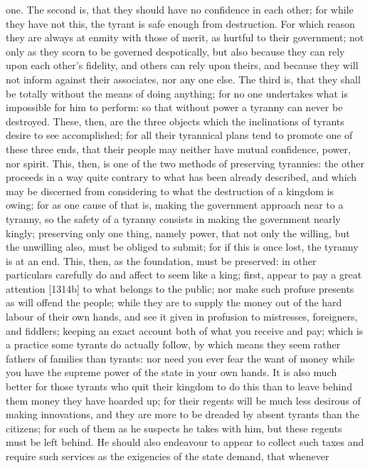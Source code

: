 one. The second is, that they should have no confidence in each other; for
while they have not this, the tyrant is safe enough from destruction. For
which reason they are always at enmity with those of merit, as hurtful to
their government; not only as they scorn to be governed despotically, but
also because they can rely upon each other's fidelity, and others can rely
upon theirs, and because they will not inform against their associates,
nor any one else. The third is, that they shall be totally without the
means of doing anything; for no one undertakes what is impossible for him
to perform: so that without power a tyranny can never be destroyed. These,
then, are the three objects which the inclinations of tyrants desire to
see accomplished; for all their tyrannical plans tend to promote one of
these three ends, that their people may neither have mutual confidence,
power, nor spirit. This, then, is one of the two methods of preserving
tyrannies: the other proceeds in a way quite contrary to what has been
already described, and which may be discerned from considering to what the
destruction of a kingdom is owing; for as one cause of that is, making the
government approach near to a tyranny, so the safety of a tyranny consists
in making the government nearly kingly; preserving only one thing, namely
power, that not only the willing, but the unwilling also, must be obliged
to submit; for if this is once lost, the tyranny is at an end. This, then,
as the foundation, must be preserved: in other particulars carefully do
and affect to seem like a king; first, appear to pay a great attention
[1314b] to what belongs to the public; nor make such profuse presents as
will offend the people; while they are to supply the money out of the hard
labour of their own hands, and see it given in profusion to mistresses,
foreigners, and fiddlers; keeping an exact account both of what you
receive and pay; which is a practice some tyrants do actually follow, by
which means they seem rather fathers of families than tyrants: nor need
you ever fear the want of money while you have the supreme power of the
state in your own hands. It is also much better for those tyrants who quit
their kingdom to do this than to leave behind them money they have hoarded
up; for their regents will be much less desirous of making innovations,
and they are more to be dreaded by absent tyrants than the citizens; for
such of them as he suspects he takes with him, but these regents must be
left behind. He should also endeavour to appear to collect such taxes and
require such services as the exigencies of the state demand, that whenever
